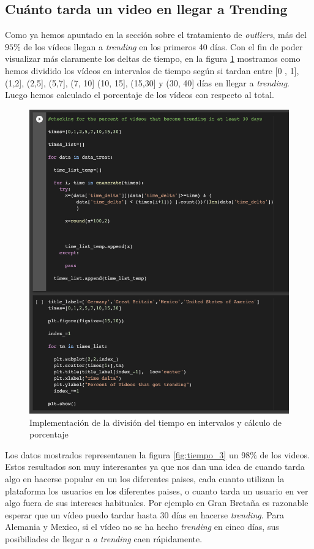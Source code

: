\documentclass[a4paper,12pt]{article}
\begin{document}
\subsection{Cu\'anto tarda un video en llegar a Trending}

Como ya hemos apuntado en la secci\'on sobre el tratamiento de {\itshape outliers}, m\'as del $95\%$ de los v\'ideos llegan a {\itshape trending} en los primeros 40 d\'ias. Con el fin de poder visualizar m\'as claramente  los deltas de tiempo, en la figura \ref{fig:tiempo_2} mostramos como hemos dividido los v\'ideos en intervalos de tiempo seg\'un si tardan entre [0 , 1], (1,2], (2,5], (5,7], (7, 10] (10, 15], (15,30] y (30, 40] d\'ias en llegar a {\itshape trending}. Luego hemos calculado el porcentaje de los v\'ideos con respecto al total.

\begin{figure}[h!]
\centering
\includegraphics[width=13cm]{plot_freq_code.png}
\caption{Implementaci\'on de la divisi\'on del tiempo en intervalos y c\'alculo de porcentaje}
\label{fig:tiempo_2}
\end{figure}



Los datos mostrados representanen la figura \ref{fig:tiempo_3}  un 98\% de los videos. Estos resultados son muy interesantes ya que nos dan una idea de cuando tarda algo en hacerse popular en un los diferentes paises, cada cuanto utilizan la plataforma los usuarios en los diferentes paises, o cuanto tarda un usuario en ver algo fuera de sus intereses habituales. Por ejemplo en Gran Breta\~na es razonable esperar que un v\'ideo puedo tardar hasta 30 d\'ias en hacerse {\itshape trending}. Para Alemania y Mexico, si el v\'ideo no se ha hecho {\itshape trending} en cinco d\'ias, sus posibiliades de llegar a {\itshape a trending} caen r\'apidamente.
\end{document}
